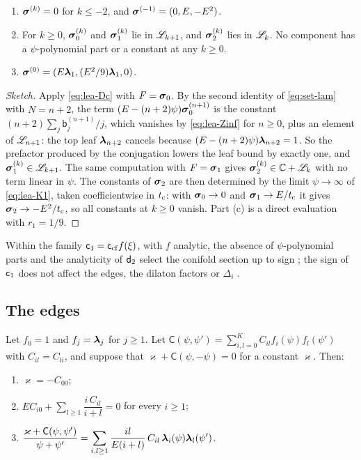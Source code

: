 \begin{prop}\label{prop:lea-H2}
\leavevmode
\begin{enumerate}
\item[(a)] $\boldsymbol{\sigma}^{(k)}=0$ for $k\le-2$, and $\boldsymbol{\sigma}^{(-1)}=(0,E,-E^2)$.
\item[(b)] For $k\ge0$, $\boldsymbol{\sigma}_0^{(k)}$ and $\boldsymbol{\sigma}_1^{(k)}$ lie in $\mathscr{L}_{k+1}$, and $\boldsymbol{\sigma}_2^{(k)}$ lies in $\mathscr{L}_k$. No component has a $\psi$-polynomial part or a constant at any $k\ge0$.
\item[(c)] $\boldsymbol{\sigma}^{(0)}=(E\boldsymbol{\lambda}_1,(E^2/9)\boldsymbol{\lambda}_1,0)$.
\end{enumerate}
\end{prop}

\begin{proof}[Sketch]
Apply \eqref{eq:lea-Dc} with $F=\boldsymbol{\sigma}_0$. By the second identity of \eqref{eq:set-lam} with $N=n+2$, the term $(E-(n+2)\psi)\boldsymbol{\sigma}_0^{(n+1)}$ is the constant $(n+2)\sum_j\mathsf{b}_j^{(n+1)}/j$, which vanishes by \eqref{eq:lea-Zinf} for $n\geq0$, plus an element of $\mathscr{L}_{n+1}$: the top leaf $\boldsymbol{\lambda}_{n+2}$ cancels because $(E-(n+2)\psi)\boldsymbol{\lambda}_{n+2}=1$. So the prefactor produced by the conjugation lowers the leaf bound by exactly one, and $\boldsymbol{\sigma}_1^{(k)}\in\mathscr{L}_{k+1}$. The same computation with $F=\boldsymbol{\sigma}_1$ gives $\boldsymbol{\sigma}_2^{(k)}\in\mathbb{C}+\mathscr{L}_k$ with no term linear in $\psi$. The constants of $\boldsymbol{\sigma}_2$ are then determined by the limit $\psi\to\infty$ of \eqref{eq:lea-K1}, taken coefficientwise in $t_{\mathrm{c}}$: with $\boldsymbol{\sigma}_0\to0$ and $\boldsymbol{\sigma}_1\to E/t_{\mathrm{c}}$ it gives $\boldsymbol{\sigma}_2\to-E^2/t_{\mathrm{c}}$, so all constants at $k\geq0$ vanish. Part \textup{(c)} is a direct evaluation with $r_1=1/9$.
\end{proof}

Within the family $\mathsf{c}_{1}=\mathsf{c}_{\mathrm{cf}} f(\xi)$, with $f$ analytic, the absence of $\psi$-polynomial parts and the analyticity of $\mathsf{d}_{2}$ select the conifold section up to sign ; the sign of $\mathsf{c}_{1}$ does not affect the edges, the dilaton factors or $\Delta_i$ .

\subsection{The edges}

\begin{lem}\label{lem:lea-res}
Let $f_0=1$ and $f_j=\boldsymbol{\lambda}_j$ for $j\ge1$. Let $\mathsf{C}(\psi,\psi')=\sum_{i,l=0}^{K}C_{il}f_i(\psi)f_l(\psi')$ with $C_{il}=C_{li}$, and suppose that $\varkappa+\mathsf{C}(\psi,-\psi)=0$ for a constant $\varkappa$. Then:
\begin{enumerate}
\item[(i)] $\varkappa=-C_{00}$;
\item[(ii)] $EC_{i0}+\sum_{l\ge1}\dfrac{i\,C_{il}}{i+l}=0$ for every $i\ge1$;
\item[(iii)] $\dfrac{\varkappa+\mathsf{C}(\psi,\psi')}{\psi+\psi'}=\displaystyle\sum_{i,l\ge1}\frac{il}{E(i+l)}\,C_{il}\,\boldsymbol{\lambda}_i(\psi)\boldsymbol{\lambda}_l(\psi')$.
\end{enumerate}
\end{lem}

